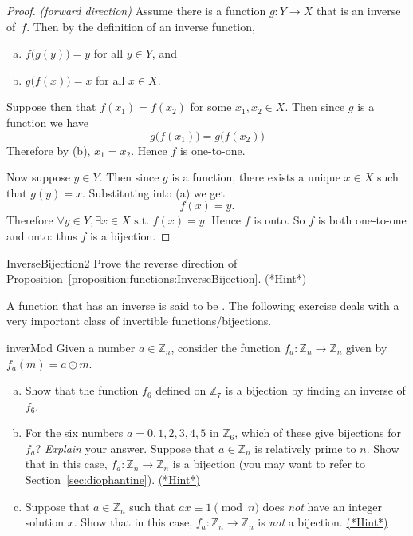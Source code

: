  
 \begin{proof} \emph{(forward direction)}
 Assume there is a function $g \colon Y \to X$ that is an inverse of~$f$. Then by the definition of an inverse function,
\begin{enumerate}[(a)]
\item $f \bigl( g(y) \bigr) = y$ for all $y \in Y$, and
\item $g \bigl( f(x) \bigr) = x$ for all $x \in X$.
\end{enumerate}
Suppose then that $f(x_1) = f(x_2)$ for some $x_1, x_2 \in X$.  Then since $g$ is a function we have
$$g \bigl( f(x_1) \bigr) = g \bigl( f(x_2) \bigr)$$
Therefore by (b), $x_1 = x_2$. Hence $f$ is one-to-one.

\noindent
Now suppose $y \in Y$.  Then since $g$ is a function, there exists a unique  $x \in X$ such that $g(y) = x$.  Substituting into (a) we get
\[f (x) = y.\]
Therefore $\forall y \in Y, \exists x \in X \mbox{ s.t. } f(x) = y$.  Hence $f$ is onto.
So $f$ is both one-to-one and onto: thus $f$ is a bijection.
 \end{proof}

\begin{exercise}{InverseBijection2}
Prove the reverse direction of Proposition~\ref{proposition:functions:InverseBijection}.
\hyperref[sec:functions:hints]{(*Hint*)} 
\end{exercise}


A function that has an inverse is said to be . The following exercise deals with a very important class of invertible functions/bijections.

\begin{exercise}{inverMod}
Given a number $a \in \mathbb{Z}_n$, consider the function $f_a: \mathbb{Z}_n \rightarrow \mathbb{Z}_n$ given by $f_a(m) = a \odot m$.
\begin{enumerate}[(a)]
\item
Show that the function $f_6$ defined on $\mathbb{Z}_7$ is a bijection by finding an inverse of $f_6$.
 \item 
For the six numbers $a=0,1,2,3,4,5$ in $\mathbb{Z}_6$, which of these give bijections for $f_a$? \emph{Explain} your answer.
Suppose that $a \in  \mathbb{Z}_n$ is relatively prime to $n$. Show that in this case, $f_a:\mathbb{Z}_n \rightarrow \mathbb{Z}_n$ is a bijection (you may want to refer to Section~\ref{sec:diophantine}).
\hyperref[sec:functions:hints]{(*Hint*)}
\item
Suppose that $a \in  \mathbb{Z}_n$ such that $ax \equiv 1 \pmod{n}$ does \emph{not} have an integer solution $x$. Show that in this case, $f_a:\mathbb{Z}_n \rightarrow \mathbb{Z}_n$ is \emph{not} a bijection.
\hyperref[sec:functions:hints]{(*Hint*)}
\end{enumerate}
\end{exercise}  

